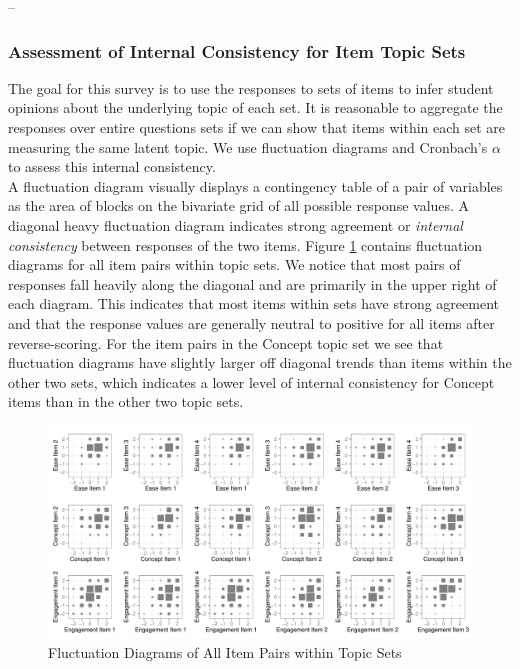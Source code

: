 \documentclass{article}\usepackage[]{graphicx}\usepackage[]{color}
\newenvironment{knitrout}{}{} %
\begin{document}
--


\subsubsection{Assessment of Internal Consistency for Item Topic Sets} 

The goal for this survey is to use the responses to sets of items to infer student opinions about the underlying topic of each set.  It is reasonable to aggregate the responses over entire questions sets if we can show that items within each set are measuring the same latent topic. We use fluctuation diagrams and Cronbach's $\alpha$ \citep{cronbach:51} to assess this internal consistency. \\

A fluctuation diagram visually displays a contingency table of a pair of variables as  the area of blocks on the bivariate grid of all possible response values. A diagonal heavy fluctuation diagram indicates strong agreement or {\it internal consistency} between responses of the two items.  Figure \ref{fig:fluctuationDiagrams} contains fluctuation diagrams for all item pairs within topic sets.    
We notice that most pairs of responses fall heavily along the diagonal and are primarily in the upper right of each diagram. This indicates that most items within sets have strong agreement and that the response values are generally neutral to positive for all items after reverse-scoring.
For the item pairs in the Concept topic set we see that fluctuation diagrams have slightly larger off diagonal trends than items within the other two sets, which indicates a lower level of internal consistency for Concept items than in the other two topic sets. 

\begin{knitrout}
\color{fgcolor}\begin{figure}[hbt]


{\centering \includegraphics[width=.98\linewidth]{figure/fluctuationDiagrams-1} 

}

\caption[Fluctuation Diagrams of All Item Pairs within Topic Sets]{Fluctuation Diagrams of All Item Pairs within Topic Sets\label{fig:fluctuationDiagrams}}
\end{figure}


\end{knitrout}
\end{document}
